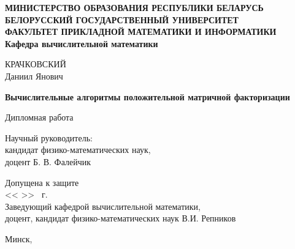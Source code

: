 \begin{titlepage}

  \begin{center}
    \textbf{МИНИСТЕРСТВО ОБРАЗОВАНИЯ РЕСПУБЛИКИ БЕЛАРУСЬ} \\
    \textbf{БЕЛОРУССКИЙ ГОСУДАРСТВЕННЫЙ УНИВЕРСИТЕТ} \\
    \textbf{ФАКУЛЬТЕТ ПРИКЛАДНОЙ МАТЕМАТИКИ И ИНФОРМАТИКИ} \\
    \textbf{Кафедра вычислительной математики}
  \end{center}

  \vfill

  \begin{center}
    КРАЧКОВСКИЙ \\
    Даниил Янович
  \end{center}

  \begin{center}
    \textbf{Вычислительные алгоритмы положительной матричной факторизации}
  \end{center}

  \vspace{2.5em}

  \begin{center}
    Дипломная работа
  \end{center}

  \vfill

  \begin{flushright}
    \begin{minipage}{0.5 \linewidth}
      Научный руководитель: \\
      кандидат физико-математических наук, \\
      доцент Б. В. Фалейчик
    \end{minipage}
  \end{flushright}

  \vspace{1cm}

  \begin{flushleft}
    Допущена к защите \\
    << \underline{\hspace{1cm}} >> \underline{\hspace{3cm}} \the\year \ г. \\
    Заведующий кафедрой вычислительной математики, \\
    доцент, кандидат физико-математических наук В.И. Репников
  \end{flushleft}

  \vspace{0.5cm}

  \begin{center}
    Минск, \the\year
  \end{center}

\end{titlepage}
